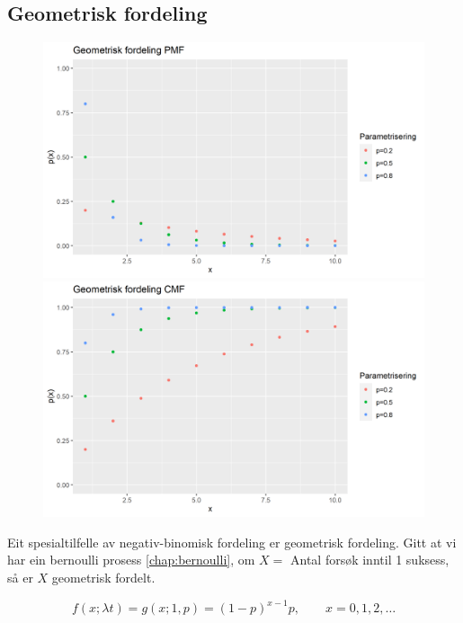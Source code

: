 \subsection{Geometrisk fordeling}
\begin{figure}[H]
  \centering
  \begin{minipage}[b]{0.49\textwidth}
    \includegraphics[width=\textwidth]{bilete/geompmf.png}
  \end{minipage}
  \hfill
  \begin{minipage}[b]{0.49\textwidth}
    \includegraphics[width=\textwidth]{bilete/geomcdf.png}
  \end{minipage}
\end{figure}

Eit spesialtilfelle av negativ-binomisk fordeling er geometrisk fordeling. Gitt at vi har ein bernoulli prosess \ref{chap:bernoulli}, om $X =$ Antal forsøk inntil 1 suksess, så er $X$ geometrisk fordelt.

\begin{equation}
    f(x; \lambda t) = g(x; 1, p) = (1-p)^{x-1}p, \qquad x = 0, 1, 2, \dots
\end{equation}


